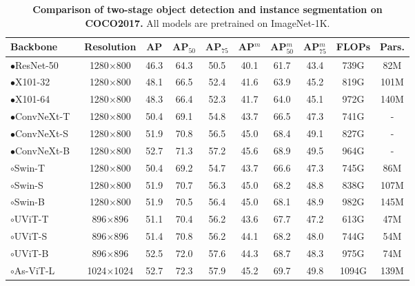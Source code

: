\documentclass[runningheads]{llncs}
\begin{document}
\begin{table}[!ht]
\centering
\footnotesize
\setlength{\tabcolsep}{2.5pt}
\renewcommand{\arraystretch}{1.}
\caption{\textbf{Comparison of two-stage object detection and instance segmentation on COCO2017.}
All models are pretrained on ImageNet-1K.}
\begin{tabular}{l|ccccccc|cc}
Backbone & Resolution & AP & AP$_{50}$ & AP$_{75}$ & AP$^{m}$ & AP$^{m}_{50}$ & AP$^{m}_{75}$ & FLOPs & Pars. \\
\toprule
\textcolor{blueish}{$\bullet$}ResNet-50~\cite{he2016deep} & 1280$\times$800 & 46.3 & 64.3 & 50.5 & 40.1 & 61.7 & 43.4 & 739G & 82M \\
\textcolor{blueish}{$\bullet$}X101-32~\cite{xie2017aggregated} & 1280$\times$800 & 48.1 & 66.5 & 52.4 & 41.6 & 63.9 & 45.2 & 819G & 101M \\
\textcolor{blueish}{$\bullet$}X101-64~\cite{xie2017aggregated} & 1280$\times$800 & 48.3 & 66.4 & 52.3 & 41.7 & 64.0 & 45.1 & 972G & 140M \\
\textcolor{blueish}{$\bullet$}ConvNeXt-T~\cite{liu2022convnet} & 1280$\times$800 & 50.4 & 69.1 & 54.8 & 43.7 & 66.5 & 47.3 &741G & -  \\
\textcolor{blueish}{$\bullet$}ConvNeXt-S~\cite{liu2022convnet} & 1280$\times$800 & 51.9 & 70.8 & 56.5 & 45.0 & 68.4 & 49.1 & 827G & - \\
\textcolor{blueish}{$\bullet$}ConvNeXt-B~\cite{liu2022convnet} & 1280$\times$800 & 52.7 & 71.3 & 57.2 & 45.6 & 68.9 & 49.5 & 964G & - \\
\midrule
\textcolor{brickred}{$\circ$}Swin-T~\cite{liu2021swin} & 1280$\times$800 &  50.4 & 69.2 & 54.7 & 43.7 & 66.6 & 47.3 & 745G &  86M \\
\textcolor{brickred}{$\circ$}Swin-S~\cite{liu2021swin} & 1280$\times$800 & 51.9 & 70.7 & 56.3 & 45.0 & 68.2 & 48.8 & 838G & 107M \\
\textcolor{brickred}{$\circ$}Swin-B~\cite{liu2021swin} & 1280$\times$800 & 51.9 & 70.5 & 56.4 & 45.0 & 68.1 & 48.9 & 982G & 145M \\
\textcolor{brickred}{$\circ$}UViT-T~\cite{chen2022uvit} & 896$\times$896 & 51.1 & 70.4 & 56.2 & 43.6 & 67.7 & 47.2 & 613G & 47M \\ \textcolor{brickred}{$\circ$}UViT-S~\cite{chen2022uvit} & 896$\times$896 & 51.4 & 70.8 & 56.2 & 44.1 & 68.2 & 48.0 & 744G & 54M \\ \textcolor{brickred}{$\circ$}UViT-B~\cite{chen2022uvit} & 896$\times$896 & 52.5 & 72.0 & 57.6 & 44.3 & 68.7 & 48.3 & 975G & 74M \\ \textcolor{brickred}{$\circ$}As-ViT-L~\cite{chen2022autoscaling} & 1024$\times$1024 & 52.7 & 72.3 & 57.9 & 45.2 & 69.7 & 49.8 & 1094G & 139M \\ 


\end{tabular}
\end{table}
\end{document}
